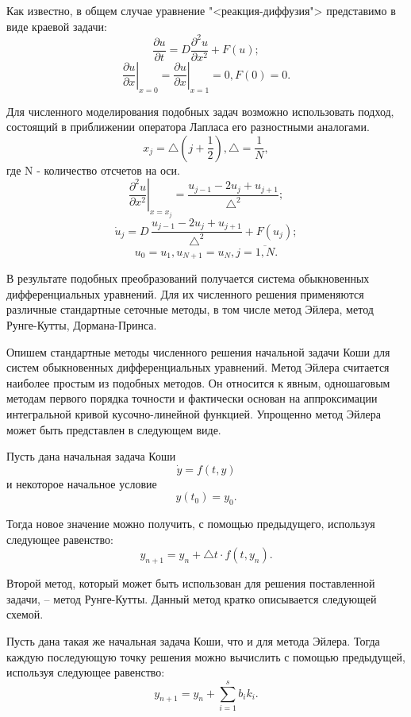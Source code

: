 \documentclass[a4paper, 14pt]{extarticle}
\theoremstyle{definition}
\begin{document}
\par Как известно, в общем случае уравнение "<реакция-диффузия"> представимо в виде краевой задачи:
$$\frac{\partial u}{\partial t} = D \frac{\partial^2 u}{\partial x^2} + F(u);$$
$$\left.{\frac{\partial u}{\partial x}} \right|_{x=0} = \left.{\frac{\partial u}{\partial x}} \right|_{x=1} = 0, F(0) = 0.$$

\par Для численного моделирования подобных задач возможно использовать подход, состоящий в приближении оператора Лапласа его разностными аналогами.
$$x_j = \bigtriangleup(j + \frac{1}{2}), \bigtriangleup = \frac{1}{N},$$
где N - количество отсчетов на оси.
$$\left.{\frac{\partial^2 u}{\partial x^2}}\right|_{x=x_j} = \frac{u_{j-1} - 2u_j + u_{j+1}}{\bigtriangleup^2};$$
$$\dot u_j = D\, \frac{u_{j-1} - 2u_j + u_{j+1}}{\bigtriangleup^2} + F(u_j);$$
$$u_0 = u_1, u_{N+1} = u_N, j = \overline{1, N}.$$

\par В результате подобных преобразований получается система обыкновенных дифференциальных уравнений. Для их численного решения применяются различные стандартные сеточные методы, в том числе метод Эйлера, метод Рунге-Кутты, Дормана-Принса.

\par Опишем стандартные методы численного решения начальной задачи Коши для систем обыкновенных дифференциальных уравнений. Метод Эйлера считается наиболее простым из подобных методов. Он относится к явным, одношаговым методам первого порядка точности и фактически основан на аппроксимации интегральной кривой кусочно-линейной функцией. Упрощенно метод Эйлера может быть представлен в следующем виде.

\par Пусть дана начальная задача Коши
$$\dot y = f(t, y)$$
и некоторое начальное условие
$$y(t_0) = y_0.$$

\par Тогда новое значение можно получить, с помощью предыдущего, используя следующее равенство:
$$y_{n+1} = y_n + \bigtriangleup t \cdot f(t, y_n).$$

\par Второй метод, который может быть использован для решения поставленной задачи, -- метод Рунге-Кутты. Данный метод кратко описывается следующей схемой.

\par Пусть дана такая же начальная задача Коши, что и для метода Эйлера. Тогда каждую последующую точку решения можно вычислить с помощью предыдущей, используя следующее равенство:
$$y_{n+1} = y_n + \sum_{i=1}^s b_i k_i.$$
\end{document}
